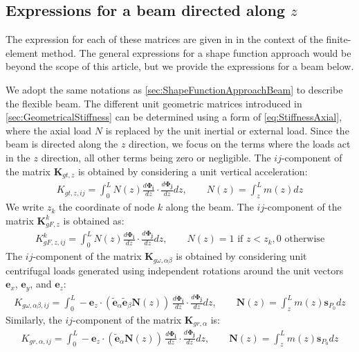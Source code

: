 \documentclass[wes, manuscript]{copernicus}
\renewcommand{\v}[1]{\boldsymbol{#1}}
\newcommand{\m}[1]{\boldsymbol{#1}}
\newcommand{\todoBoth}    [1]{{\colorbox{yellow}{TODO Both:    }}{\color{red}{#1}}\colorbox{yellow}{/}}
\begin{document}
\subsection{Expressions for a beam directed along $z$}
The expression for each of these matrices are given in \cite{Schwertassek:book} in the context of the finite-element method.  The general expressions for a shape function approach would be beyond the scope of this article, but we provide the expressions for a beam below.


We adopt the same notations as \autoref{sec:ShapeFunctionApproachBeam} to describe the flexible beam.
The different unit geometric matrices introduced in \autoref{sec:GeometricalStiffness} can be determined using a form of \autoref{eq:StiffnessAxial}, where the axial load $N$ is replaced by the unit inertial or external load. Since the beam is directed along the $z$ direction, we focus on the terms where the loads act in the $z$ direction, all other terms being zero or negligible.
The $ij$-component of the matrix $\m{K}_{gt,z}$ is obtained by considering a unit vertical acceleration:
\begin{align}
   K_{gt,z,ij} = \int_0^L N(z) \frac{d\v{\Phi_i}}{dz}\cdot\frac{d\v{\Phi_j}}{dz} dz, 
   \qquad
   N(z) = \int_z^L m(z) dz
\end{align}
% 
We write $z_k$ the coordinate of node $k$ along the beam. The $ij$-component of the matrix $\m{K}_{gF,z}^k$ is obtained as:
\begin{align}
   K_{gF,z,ij}^k = \int_0^L N(z) \frac{d\v{\Phi_i}}{dz}\cdot\frac{d\v{\Phi_j}}{dz} dz, 
   \qquad
   N(z) = 1 \text{ if $z<z_k$}, 0 \text{ otherwise} 
\end{align}
The $ij$-component of the matrix $\m{K}_{g\omega,\alpha\beta}$ is obtained by considering unit centrifugal loads generated using independent rotations around the unit vectors $\v{e}_x$, $\v{e}_y$, and $\v{e}_z$:
\begin{align}
   K_{g\omega,\alpha\beta,ij} = \int_0^L -\v{e}_z\cdot\left(\tilde{\v{e}}_\alpha\tilde{\v{e}}_\beta \v{N}(z) \right)
   \, \frac{d\v{\Phi_i}}{dz}\cdot\frac{d\v{\Phi_j}}{dz} dz, 
   \qquad
   \v{N}(z) =  \int_z^L m(z) \v{s}_{P_0} dz
\end{align}
Similarly, the $ij$-component of the matrix $\m{K}_{gr,\alpha}$ is:
\begin{align}
   K_{gr,\alpha,ij} = \int_0^L -\v{e}_z\cdot\left(\tilde{\v{e}}_\alpha \v{N}(z) \right)
   \, \frac{d\v{\Phi_i}}{dz}\cdot\frac{d\v{\Phi_j}}{dz} dz, 
   \qquad
   \v{N}(z) =  \int_z^L m(z) \v{s}_{P_0} dz
\end{align}
\end{document}
